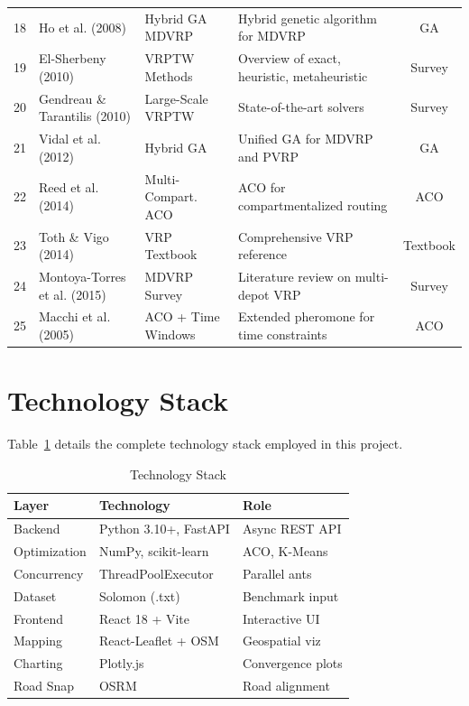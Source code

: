 \documentclass[10pt,conference]{IEEEtran}
\begin{document}
\begin{table}[t]
\begin{center}
\begin{tabular}{|c|l|l|l|c|}
18 & Ho et al. (2008) & Hybrid GA MDVRP & Hybrid genetic algorithm for MDVRP & GA \\
19 & El-Sherbeny (2010) & VRPTW Methods & Overview of exact, heuristic, metaheuristic & Survey \\
20 & Gendreau \& Tarantilis (2010) & Large-Scale VRPTW & State-of-the-art solvers & Survey \\
21 & Vidal et al. (2012) & Hybrid GA & Unified GA for MDVRP and PVRP & GA \\
22 & Reed et al. (2014) & Multi-Compart. ACO & ACO for compartmentalized routing & ACO \\
23 & Toth \& Vigo (2014) & VRP Textbook & Comprehensive VRP reference & Textbook \\
24 & Montoya-Torres et al. (2015) & MDVRP Survey & Literature review on multi-depot VRP & Survey \\
25 & Macchi et al. (2005) & ACO + Time Windows & Extended pheromone for time constraints & ACO \\
\hline
\end{tabular}
\end{center}
\end{table}

\section{Technology Stack}

Table~\ref{tab:tech_stack} details the complete technology stack employed in this project.

\begin{table}[h]
\caption{Technology Stack}
\label{tab:tech_stack}
\begin{center}
\begin{tabular}{|l|l|l|}
\hline
\textbf{Layer} & \textbf{Technology} & \textbf{Role} \\
\hline
Backend & Python 3.10+, FastAPI & Async REST API \\
Optimization & NumPy, scikit-learn & ACO, K-Means \\
Concurrency & ThreadPoolExecutor & Parallel ants \\
Dataset & Solomon (.txt) & Benchmark input \\
Frontend & React 18 + Vite & Interactive UI \\
Mapping & React-Leaflet + OSM & Geospatial viz \\
Charting & Plotly.js & Convergence plots \\
Road Snap & OSRM & Road alignment \\
\hline
\end{tabular}
\end{center}
\end{table}
\end{document}
